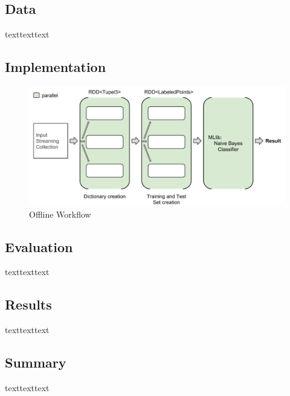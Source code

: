 \documentclass[12pt]{article}
\begin{document}
\subsection{Data}
texttexttext

\newpage
\subsection{Implementation}

\begin{figure}[htbp]
  \centering
  \includegraphics[scale=0.56]{VisualisationOfflineWorkflow.pdf}
  \caption{Offline Workflow}
\end{figure}

\subsection{Evaluation}
texttexttext

\subsection{Results}
texttexttext

\subsection{Summary}
texttexttext




\newpage
\medskip

\end{document}
